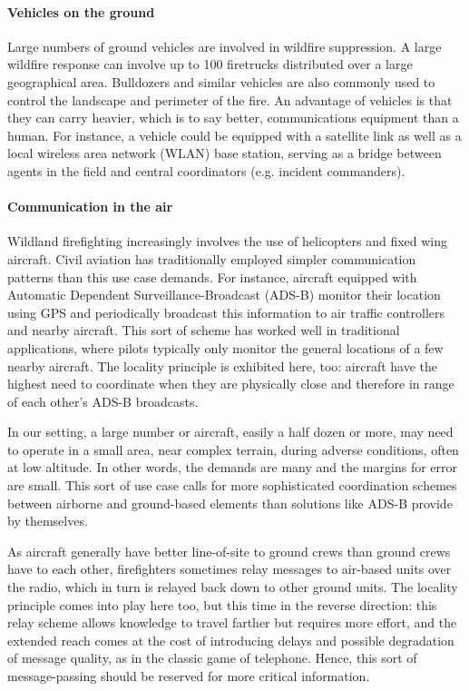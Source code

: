 \documentclass[]             %
{NASA}                       %
\theoremstyle{definition}
\begin{document}
\paragraph{Vehicles on the ground}
Large numbers of ground vehicles are involved in wildfire
suppression. A large wildfire response can involve up to 100
firetrucks distributed over a large geographical area. Bulldozers and
similar vehicles are also commonly used to control the landscape and
perimeter of the fire. An advantage of vehicles is that they can carry
heavier, which is to say better, communications equipment than a
human. For instance, a vehicle could be equipped with a satellite link
as well as a local wireless area network (WLAN) base station, serving
as a bridge between agents in the field and central coordinators
(e.g. incident commanders).

\paragraph{Communication in the air}

Wildland firefighting increasingly involves the use of helicopters and
fixed wing aircraft. Civil aviation has traditionally employed simpler
communication patterns than this use case demands. For instance,
aircraft equipped with Automatic Dependent Surveillance-Broadcast
(ADS-B) monitor their location using GPS and periodically broadcast
this information to air traffic controllers and nearby aircraft. This
sort of scheme has worked well in traditional applications, where
pilots typically only monitor the general locations of a few nearby
aircraft. The locality principle is exhibited here, too: aircraft have
the highest need to coordinate when they are physically close and
therefore in range of each other's ADS-B broadcasts.

In our setting, a large number or aircraft, easily a half dozen or
more, may need to operate in a small area, near complex terrain,
during adverse conditions, often at low altitude. In other words, the
demands are many and the margins for error are small. This sort of use
case calls for more sophisticated coordination schemes between
airborne and ground-based elements than solutions like ADS-B provide
by themselves.

As aircraft generally have better line-of-site to ground crews than
ground crews have to each other, firefighters sometimes relay messages
to air-based units over the radio, which in turn is relayed back down
to other ground units. The locality principle comes into play here
too, but this time in the reverse direction: this relay scheme allows
knowledge to travel farther but requires more effort, and the extended
reach comes at the cost of introducing delays and possible degradation
of message quality, as in the classic game of telephone. Hence, this
sort of message-passing should be reserved for more critical
information.
\end{document}
